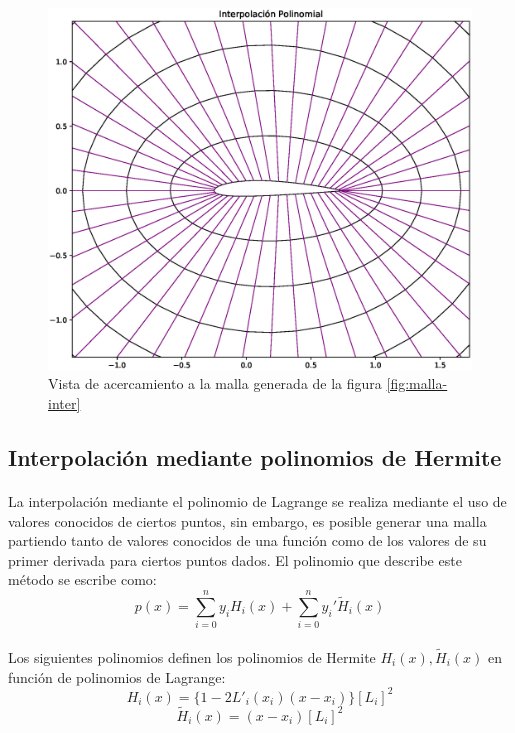 \documentclass[letterpaper, openright, 12pt]{book}
\begin{document}
				\begin{figure}[htbp!]
					\centering
					\includegraphics[width=120mm]{./Imagenes/M-inter_pol_cerca}
					\captionsetup{justification=centering, margin=2cm}
					\caption[Malla Interpolación Polinomial Acercamiento]{Vista de acercamiento a la malla generada de la figura \ref{fig:malla-inter} }
					\label{fig:malla-inter-cerca}
				\end{figure}
		
		\subsection{Interpolación mediante polinomios de Hermite}
			\paragraph*{}
				La interpolación mediante el polinomio de Lagrange se realiza mediante el uso de valores conocidos de ciertos puntos, sin embargo, es posible generar una malla partiendo tanto de valores conocidos de una función como de los valores de su primer derivada para ciertos puntos dados. El polinomio que describe este método se escribe como:
				\begin{equation}
					p(x) = \sum_{i = 0}^{n} y_{i}H_{i}(x) + \sum_{i = 0}^{n}y_{i}\prime \widetilde{H}_{i}(x)
				\end{equation}
			
			\paragraph*{}
				Los siguientes polinomios definen los polinomios de Hermite $H_{i}(x), \widetilde{H}_{i}(x)$ en función de polinomios de Lagrange:
				\begin{equation}
					H_{i}(x) = \{  1 - 2L\prime_{i}(x_{i})(x - x_{i})  \} \left[L_{i}\right]^2
				\end{equation}
				\begin{equation}
					\widetilde{H}_{i}(x) = (x - x_{i}) \left[L_{i}\right] ^ 2
				\end{equation}
\end{document}
